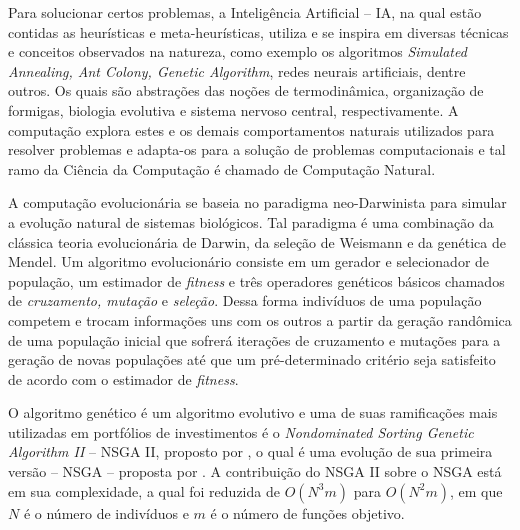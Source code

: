 \documentclass[11pt]{article}
\begin{document}
    
    Para solucionar certos problemas, a Inteligência Artificial -- IA, na qual estão contidas as heurísticas e meta-heurísticas, utiliza e se inspira em diversas técnicas e conceitos observados na natureza, como exemplo os algoritmos \textit{Simulated Annealing, Ant Colony, Genetic Algorithm}, redes neurais artificiais, dentre outros. Os quais são abstrações das noções de termodinâmica, organização de formigas, biologia evolutiva e sistema nervoso central, respectivamente. A computação explora estes e os demais comportamentos naturais utilizados para resolver problemas e adapta-os para a solução de problemas computacionais e tal ramo da Ciência da Computação é chamado de Computação Natural. \cite{goedert} 
    
    A computação evolucionária se baseia no paradigma neo-Darwinista para simular a evolução natural de sistemas biológicos. Tal paradigma é uma combinação da clássica teoria evolucionária de Darwin, da seleção de Weismann e da genética de Mendel. Um algoritmo evolucionário consiste em um gerador e selecionador de população, um estimador de \textit{fitness} e três operadores genéticos básicos chamados de \textit{cruzamento, mutação} e \textit{seleção}. Dessa forma indivíduos de uma população competem e trocam informações uns com os outros a partir da geração randômica de uma população inicial que sofrerá iterações de cruzamento e mutações para a geração de novas populações até que um pré-determinado critério seja satisfeito de acordo com o estimador de \textit{fitness}. \cite{metaheuristic}
    
    
    O algoritmo genético é um algoritmo evolutivo e uma de suas ramificações mais utilizadas em portfólios de investimentos é o \textit{Nondominated Sorting Genetic Algorithm II} -- NSGA II, proposto por , o qual é uma evolução de sua primeira versão -- NSGA -- proposta por . A contribuição do NSGA II sobre o NSGA está em sua complexidade, a qual foi reduzida de $O(N^3m)$ para $O(N^2m)$, em que $N$ é o número de indivíduos e $m$ é o número de funções objetivo.
    
\end{document}
